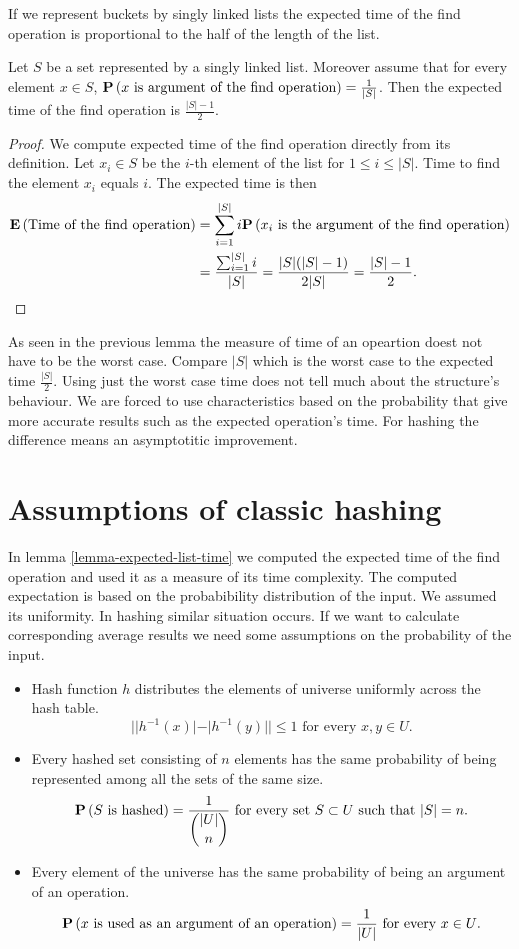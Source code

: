 If we represent buckets by singly linked lists the expected time of the find operation is proportional to the half of the length of the list.
\begin{lemma}
\label{lemma-expected-list-time}
Let $S$ be a set represented by a singly linked list. Moreover assume that for every element $x \in S$, $\mathbf{P}\left(x \text{ is argument of the find operation}\right) = \frac{1}{|S|}$. Then the expected time of the find operation is $\frac{|S| - 1}{2}$.
\end{lemma}
\begin{proof}
We compute expected time of the find operation directly from its definition. Let $x_i \in S$ be the $i$-th element of the list for $1 \leq i \leq |S|$. Time to find the element $x_i$ equals $i$. The expected time is then
\[
\begin{split}
\mathbf{E}\left(\text{Time of the find operation}\right) 
	& = \displaystyle\sum_{i = 1}^{|S|} i \mathbf{P}\left(x_i \text{ is the argument of the find operation}\right) \\
	& = \frac{\sum_{i = 1}^{|S|}{i}}{|S|} = \frac{|S|(|S| - 1)}{2 |S|} = \frac{|S| - 1}{2} \text{.}
\end{split}
\]
\end{proof}

As seen in the previous lemma the measure of time of an opeartion doest not have to be the worst case. Compare $|S|$ which is the worst case to the expected time $\frac{|S|}{2}$. Using just the worst case time does not tell much about the structure's behaviour. We are forced to use characteristics based on the probability that give more accurate results such as the expected operation's time. For hashing the difference means an asymptotitic improvement.

\section{Assumptions of classic hashing}
In lemma \ref{lemma-expected-list-time} we computed the expected time of the find operation and used it as a measure of its time complexity. The computed expectation is based on the probabibility distribution of the input. We assumed its uniformity. In hashing similar situation occurs. If we want to calculate corresponding average results we need some assumptions on the probability of the input.
\begin{itemize}
\item Hash function $h$ distributes the elements of universe uniformly across the hash table.
\[
||h^{-1}(x)| - |h^{-1}(y)|| \leq 1 \text{ for every }x, y \in U \text{.}
\]
\item Every hashed set consisting of $n$ elements has the same probability of being represented among all the sets of the same size.
\[
\mathbf{P}\left(S \text{ is hashed}\right) = \frac{1}{\dbinom{|U|}{n}} \text{ for every set } S \subset U \text{ such that } |S| = n \text{.}
\]
\item Every element of the universe has the same probability of being an argument of an operation.
\[
\mathbf{P}\left(x \text{ is used as an argument of an operation}\right) = \frac{1}{|U|} \text{ for every } x \in U \text{.}
\]
\end{itemize}

